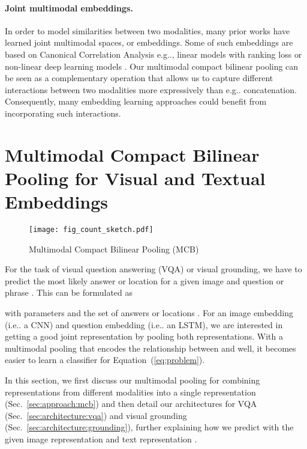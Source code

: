 \documentclass[11pt,letterpaper]{article}
\makeatletter
\DeclareRobustCommand\onedot{\futurelet\@let@token\@onedot}
\def\@onedot{\ifx\@let@token.\else.\null\fi\xspace}
\def\eg{e.g\onedot} \def\Eg{E.g\onedot}
\def\ie{i.e\onedot} \def\Ie{I.e\onedot}
\DeclareRobustCommand{\secref}[1]{Sec.~\ref{#1}}
\DeclareRobustCommand{\Eqnref}[1]{Equation~(\ref{#1})}
\makeatother
\begin{document}
\paragraph{Joint multimodal embeddings.}
In order to model similarities between two modalities, many prior works have learned joint multimodal spaces, or embeddings. Some of such embeddings are based on Canonical Correlation Analysis \cite{hardoon2004canonical} \eg \cite{gong14eccv,klein15cvpr,plummer15iccv}, linear models with ranking loss \cite{frome2013devise,karpathy15cvpr,socher2014grounded,weston2011wsabie} or non-linear deep learning models \cite{kiros2014multimodal,mao2014deep,ngiam2011multimodal}. Our multimodal compact bilinear pooling can be seen as a complementary operation that allows us to capture different interactions between two modalities more expressively than \eg concatenation. Consequently, many embedding learning approaches could benefit from incorporating such interactions.

\section{Multimodal Compact Bilinear Pooling for Visual and Textual Embeddings}
\label{sec:approach}


\begin{figure}[t]
\texttt{[image: fig\_count\_sketch.pdf]}
\vspace{-0.5cm}
\caption{Multimodal Compact Bilinear Pooling (MCB)}
\label{fig:count_sketch}
\end{figure}



For the task of visual question answering (VQA) or visual grounding, we have to predict the most likely answer or location  for a given image  and question or phrase . This can be formulated as

\newcommand*{\argmin}{\operatornamewithlimits{argmin}\limits}
\newcommand*{\argmax}{\operatornamewithlimits{argmax}\limits}


with parameters  and the set of answers or locations .
For an image embedding  (\ie a CNN) and question embedding  (\ie an LSTM), we are interested in getting a good joint representation by pooling both representations. With a multimodal pooling  that encodes the relationship between  and  well, it becomes easier to learn a classifier for \Eqnref{eq:problem}. 

In this section, we first discuss our multimodal pooling  for combining representations from different modalities into a single representation (\secref{sec:approach:mcb}) and then detail our architectures for VQA (\secref{sec:architecture:vqa}) and visual grounding (\secref{sec:architecture:grounding}), further explaining how we predict  with the given image representation  and text representation .
\end{document}
